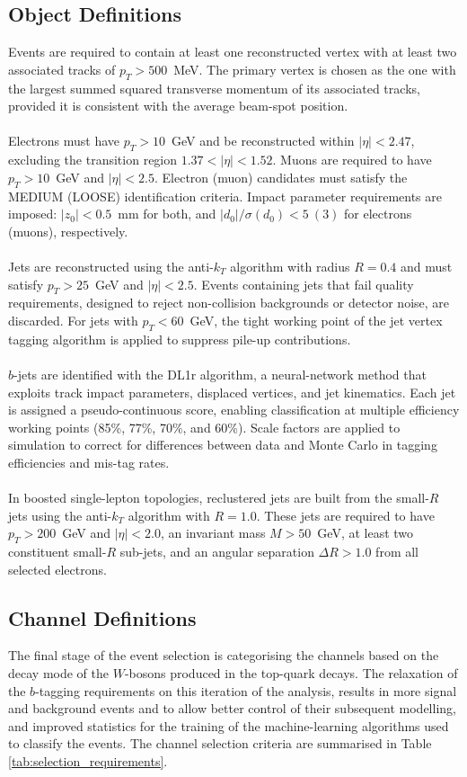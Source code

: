 \subsection{Object Definitions}
Events are required to contain at least one reconstructed vertex with at least two associated tracks of $p_{T} > 500$~MeV. The primary vertex is chosen as the one with the largest summed squared transverse momentum of its associated tracks, provided it is consistent with the average beam-spot position.  
\\
\\
Electrons must have $p_{T} > 10$~GeV and be reconstructed within $|\eta| < 2.47$, excluding the transition region $1.37 < |\eta| < 1.52$. Muons are required to have $p_{T} > 10$~GeV and $|\eta| < 2.5$. Electron (muon) candidates must satisfy the MEDIUM (LOOSE) identification criteria. Impact parameter requirements are imposed: $|z_{0}| < 0.5$~mm for both, and $|d_{0}|/\sigma(d_{0}) < 5~(3)$ for electrons (muons), respectively.  
\\
\\
Jets are reconstructed using the anti-$k_{T}$ algorithm with radius $R=0.4$ and must satisfy $p_{T} > 25$~GeV and $|\eta| < 2.5$. Events containing jets that fail quality requirements, designed to reject non-collision backgrounds or detector noise, are discarded. For jets with $p_{T} < 60$~GeV, the tight working point of the jet vertex tagging algorithm \cite{JetFitter} is applied to suppress pile-up contributions.  
\\
\\
$b$-jets are identified with the DL1r algorithm, a neural-network method that exploits track impact parameters, displaced vertices, and jet kinematics. Each jet is assigned a pseudo-continuous score, enabling classification at multiple efficiency working points (85\%, 77\%, 70\%, and 60\%). Scale factors are applied to simulation to correct for differences between data and Monte Carlo in tagging efficiencies and mis-tag rates.  
\\
\\
In boosted single-lepton topologies, reclustered jets are built from the small-$R$ jets using the anti-$k_{T}$ algorithm with $R=1.0$. These jets are required to have $p_{T} > 200$~GeV and $|\eta| < 2.0$, an invariant mass $M > 50$~GeV, at least two constituent small-$R$ sub-jets, and an angular separation $\Delta R > 1.0$ from all selected electrons.
\subsection{Channel Definitions}
The final stage of the event selection is categorising the channels based on the decay mode of the $W$-bosons produced in the top-quark decays. The relaxation of the $b$-tagging requirements on this iteration of the analysis, results in more signal and background events and to allow better control of their subsequent modelling, and improved statistics for the training of the machine-learning algorithms used to classify the events. The channel selection criteria are summarised in Table \ref{tab:selection_requirements}.
